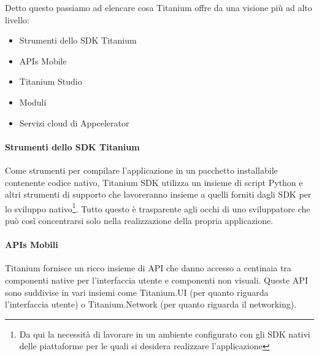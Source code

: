             \clearpage
            \noindent Detto questo passiamo ad elencare cosa Titanium offre da
            una visione più ad alto livello\citep[Cap.2 - Titanium
            Mobile Overview]{Book:Ti}:
            \begin{itemize}
                \item Strumenti dello SDK Titanium
                \item APIs Mobile
                \item Titanium Studio
                \item Moduli
                \item Servizi cloud di Appcelerator
            \end{itemize}

            \paragraph{Strumenti dello SDK Titanium}
                Come strumenti per compilare l'applicazione in un pacchetto
                installabile contenente codice nativo, Titanium SDK utilizza un
                insieme di script Python e altri strumenti di supporto che
                lavoreranno insieme a quelli forniti dagli SDK per lo sviluppo
                nativo\footnote{Da qui la necessità di lavorare in un ambiente
                configurato con gli SDK nativi delle piattaforme per le quali si
                desidera realizzare l'applicazione}. Tutto questo è trasparente
                agli occhi di uno sviluppatore che può così concentrarsi solo
                nella realizzazione della propria applicazione.

            \paragraph{APIs Mobili}
                Titanium fornisce un ricco insieme di API \js{} che danno
                accesso a centinaia tra componenti native per l'interfaccia
                utente e componenti non visuali. Queste API sono suddivise in
                vari insiemi come Titanium.UI (per quanto riguarda l'interfaccia
                utente) o Titanium.Network (per quanto riguarda il networking).

